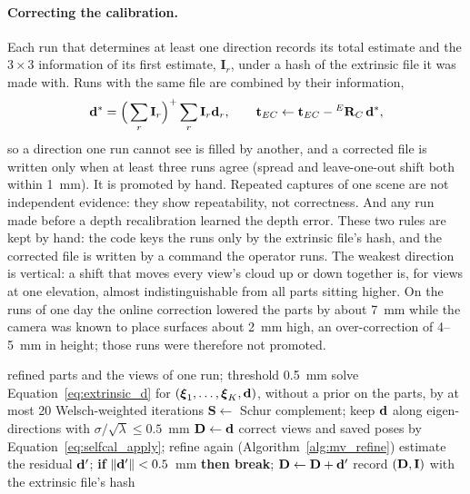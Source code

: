 \paragraph{Correcting the calibration.} Each run that determines at least one direction records its
total estimate and the $3\times3$ information of its first estimate, $\mathbf{I}_r$, under a hash of
the extrinsic file it was made with. Runs with the same file are
combined by their information,
\begin{equation}
\mathbf{d}^{*}=\Big(\sum_r\mathbf{I}_r\Big)^{+}\sum_r\mathbf{I}_r\mathbf{d}_r,
\qquad \mathbf{t}_{EC}\leftarrow\mathbf{t}_{EC}-{}^{E}\mathbf{R}_{C}\,\mathbf{d}^{*},
\label{eq:selfcal_combine}
\end{equation}
so a direction one run cannot see is filled by another, and a corrected file is written only when at
least three runs agree (spread and leave-one-out shift both within 1~mm). It is promoted by hand.
Repeated captures of one scene are not independent evidence: they show repeatability, not
correctness. And any run made before a depth recalibration learned the depth error. These two rules
are kept by hand: the code keys the runs only by the extrinsic file's hash, and the corrected file is
written by a command the operator runs. The weakest
direction is vertical: a shift that moves every view's cloud up or down together is, for views at one
elevation, almost indistinguishable from all parts sitting higher. On the runs of one day the online
correction lowered the parts by about 7~mm while the camera was known to place surfaces about 2~mm
high, an over-correction of 4--5~mm in height; those runs were therefore not promoted.

\begin{algorithm}[htbp]
\caption{Extrinsic-translation estimate and online self-calibration}
\label{alg:mv_selfcal}
\begin{algorithmic}[1]
\REQUIRE refined parts and the views of one run; threshold 0.5~mm
\STATE solve Equation~\ref{eq:extrinsic_d} for $(\boldsymbol{\xi}_1,\dots,\boldsymbol{\xi}_K,\mathbf{d})$, without a prior on the parts, by at most 20 Welsch-weighted iterations
\STATE $\mathbf{S}\gets$ Schur complement; keep $\mathbf{d}$ along eigen-directions with $\sigma/\sqrt{\lambda}\le0.5$~mm
  \STATE $\mathbf{D}\gets\mathbf{d}$
    \STATE correct views and saved poses by Equation~\ref{eq:selfcal_apply}; refine again (Algorithm~\ref{alg:mv_refine})
    \STATE estimate the residual $\mathbf{d}'$; \textbf{if} $\left\lVert\mathbf{d}'\right\rVert<0.5$~mm \textbf{then break}; $\mathbf{D}\gets\mathbf{D}+\mathbf{d}'$
  \ENDFOR
\ENDIF
\STATE record $(\mathbf{D},\mathbf{I})$ with the extrinsic file's hash 
\end{algorithmic}
\end{algorithm}

